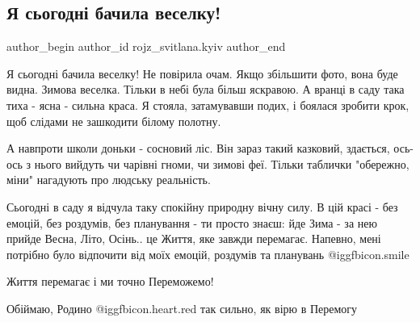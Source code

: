  
 
 
 
 
 
\subsection{Я сьогодні бачила веселку!}
\label{sec:01_12_2022.fb.rojz_svitlana.kyiv.1.veselka}
 
\ifcmt
 author_begin
   author_id rojz_svitlana.kyiv
 author_end
\fi

Я сьогодні бачила веселку! Не повірила очам. Якщо збільшити фото, вона буде
видна. Зимова веселка. Тільки в небі була більш яскравою. А вранці в саду така
тиха - ясна -  сильна краса. Я стояла, затамувавши подих, і боялася зробити
крок, щоб слідами не зашкодити білому полотну. 

А навпроти школи доньки - сосновий ліс. Він зараз такий казковий, здається,
ось-ось з нього вийдуть чи чарівні гноми, чи зимові феї. Тільки таблички
"обережно, міни" нагадують про людську реальність. 

Сьогодні в саду я відчула таку спокійну природну вічну силу. В цій красі - без
емоцій, без роздумів, без планування - ти просто знаєш: йде Зима - за нею
прийде Весна, Літо, Осінь.. це Життя, яке завжди перемагає. Напевно, мені
потрібно було відпочити від моїх емоцій, роздумів та планувань  @igg{fbicon.smile}  

Життя перемагає і ми точно Переможемо!

Обіймаю, Родино @igg{fbicon.heart.red} так сильно, як вірю в Перемогу
